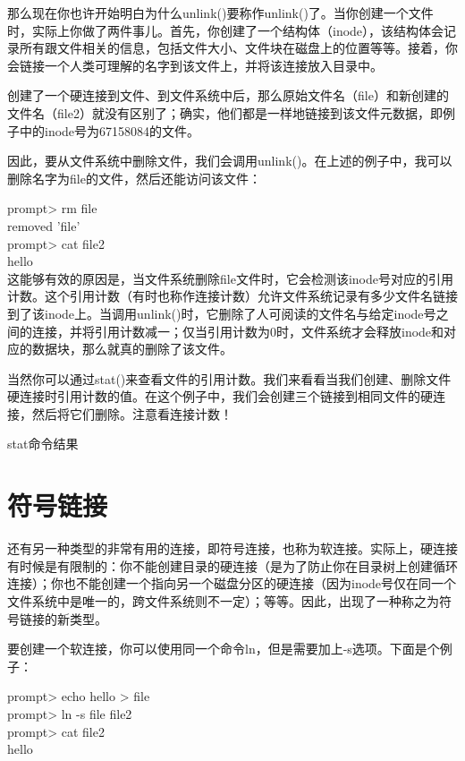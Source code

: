 那么现在你也许开始明白为什么unlink()要称作unlink()了。当你创建一个文件时，实际上你做了两件事儿。首先，你创建了一个结构体（inode），该结构体会记录所有跟文件相关的信息，包括文件大小、文件块在磁盘上的位置等等。接着，你会链接一个人类可理解的名字到该文件上，并将该连接放入目录中。

创建了一个硬连接到文件、到文件系统中后，那么原始文件名（file）和新创建的文件名（file2）就没有区别了；确实，他们都是一样地链接到该文件元数据，即例子中的inode号为67158084的文件。

因此，要从文件系统中删除文件，我们会调用unlink()。在上述的例子中，我可以删除名字为file的文件，然后还能访问该文件：

prompt> rm file\\
removed 'file'\\
prompt> cat file2\\
hello\\

这能够有效的原因是，当文件系统删除file文件时，它会检测该inode号对应的引用计数。这个引用计数（有时也称作连接计数）允许文件系统记录有多少文件名链接到了该inode上。当调用unlink()时，它删除了人可阅读的文件名与给定inode号之间的连接，并将引用计数减一；仅当引用计数为0时，文件系统才会释放inode和对应的数据块，那么就真的删除了该文件。

当然你可以通过stat()来查看文件的引用计数。我们来看看当我们创建、删除文件硬连接时引用计数的值。在这个例子中，我们会创建三个链接到相同文件的硬连接，然后将它们删除。注意看连接计数！

stat命令结果\\

\section{符号链接}

还有另一种类型的非常有用的连接，即符号连接，也称为软连接。实际上，硬连接有时候是有限制的：你不能创建目录的硬连接（是为了防止你在目录树上创建循环连接）；你也不能创建一个指向另一个磁盘分区的硬连接（因为inode号仅在同一个文件系统中是唯一的，跨文件系统则不一定）；等等。因此，出现了一种称之为符号链接的新类型。

要创建一个软连接，你可以使用同一个命令ln，但是需要加上-s选项。下面是个例子：

prompt> echo hello > file\\
prompt> ln -s file file2\\
prompt> cat file2\\
hello\\

